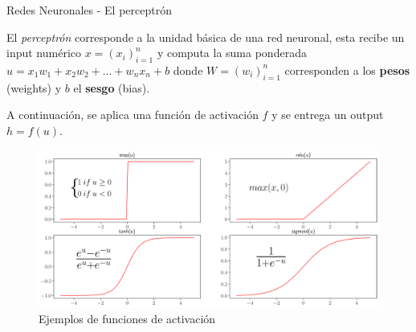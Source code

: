 \documentclass[9pt]{beamer}
\begin{document}
\begin{frame}{Redes Neuronales - El perceptrón}

El \textit{perceptrón} corresponde a la unidad básica de una red neuronal, esta recibe un input numérico $x = (x_i)_{i=1}^n$ y computa la suma ponderada $u = x_1w_1 + x_2w_2 + \dots + w_nx_n + b$ donde $W = (w_i)_{i=1}^n$ corresponden a los \textbf{pesos} (weights) y $b$ el \textbf{sesgo} (bias). \pause 

A continuación, se aplica una función de activación $f$ y se entrega un output $h = f(u)$. \pause 
\begin{figure}[H]
  \centering
  \includegraphics[scale=.3]{../img/cap5_activaciones}
  \caption{Ejemplos de funciones de activación}
\end{figure}






\end{frame}


%
\end{document}
